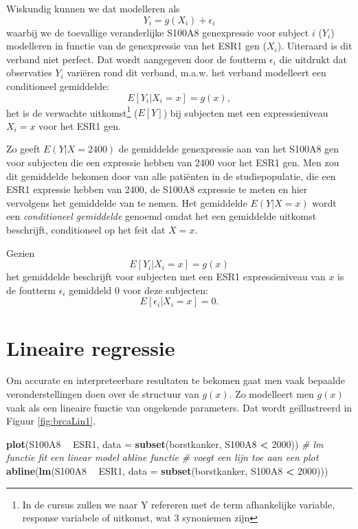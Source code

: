 \documentclass[12pt,dutch,coursenotes]{book}
\newenvironment{Shaded}{\begin{snugshade}}{\end{snugshade}}
\newcommand{\KeywordTok}[1]{\textcolor[rgb]{0.13,0.29,0.53}{\textbf{#1}}}
\newcommand{\DataTypeTok}[1]{\textcolor[rgb]{0.13,0.29,0.53}{#1}}
\newcommand{\DecValTok}[1]{\textcolor[rgb]{0.00,0.00,0.81}{#1}}
\newcommand{\StringTok}[1]{\textcolor[rgb]{0.31,0.60,0.02}{#1}}
\newcommand{\CommentTok}[1]{\textcolor[rgb]{0.56,0.35,0.01}{\textit{#1}}}
\newcommand{\OperatorTok}[1]{\textcolor[rgb]{0.81,0.36,0.00}{\textbf{#1}}}
\newcommand{\NormalTok}[1]{#1}
\let\rmarkdownfootnote\footnote%
\def\footnote{\protect\rmarkdownfootnote}
\theoremstyle{definition}
\theoremstyle{definition}
\theoremstyle{definition}
\theoremstyle{remark}
\begin{document}
Wiskundig kunnen we dat modelleren als \[Y_i=g(X_i)+\epsilon_i\] waarbij
we de toevallige veranderlijke S100A8 genexpressie voor subject \(i\)
(\(Y_i\)) modelleren in functie van de genexpressie van het ESR1 gen
(\(X_i\)). Uiteraard is dit verband niet perfect. Dat wordt aangegeven
door de foutterm \(\epsilon_i\) die uitdrukt dat observaties \(Y_i\)
variëren rond dit verband, m.a.w. het verband modelleert een
conditioneel gemiddelde: \[E[Y_i|X_i=x]=g(x),\] het is de verwachte
uitkomst\footnote{In de cursus zullen we naar Y refereren met de term
  afhankelijke variable, response variabele of uitkomst, wat 3
  synoniemen zijn} (\(E[Y]\)) bij subjecten met een expressieniveau
\(X_i=x\) voor het ESR1 gen.

Zo geeft \(E(Y|X=2400)\) de gemiddelde genexpressie aan van het S100A8
gen voor subjecten die een expressie hebben van 2400 voor het ESR1 gen.
Men zou dit gemiddelde bekomen door van alle patiënten in de
studiepopulatie, die een ESR1 expressie hebben van 2400, de S100A8
expressie te meten en hier vervolgens het gemiddelde van te nemen. Het
gemiddelde \(E(Y|X=x)\) wordt een \emph{conditioneel gemiddelde} genoemd
omdat het een gemiddelde uitkomst beschrijft, conditioneel op het feit
dat \(X=x\).

Gezien \[E[Y_i|X_i=x]=g(x)\] het gemiddelde beschrijft voor subjecten
met een ESR1 expressieniveau van \(x\) is de foutterm \(\epsilon_i\)
gemiddeld 0 voor deze subjecten: \[E[\epsilon_i\vert X_i=x]=0.\]

\section{Lineaire regressie}\label{lineaire-regressie}

Om accurate en interpreteerbare resultaten te bekomen gaat men vaak
bepaalde veronderstellingen doen over de structuur van \(g(x)\). Zo
modelleert men \(g(x)\) vaak als een lineaire functie van ongekende
parameters. Dat wordt geïllustreerd in Figuur \ref{fig:brcaLin1}.

\begin{Shaded}
\begin{Highlighting}[]
\KeywordTok{plot}\NormalTok{(S100A8 }\OperatorTok{~}\StringTok{ }\NormalTok{ESR1, }\DataTypeTok{data =} \KeywordTok{subset}\NormalTok{(borstkanker, S100A8 }\OperatorTok{<}\StringTok{ }
\StringTok{    }\DecValTok{2000}\NormalTok{))}
\CommentTok{# lm functie fit een linear model abline functie}
\CommentTok{# voegt een lijn toe aan een plot}
\KeywordTok{abline}\NormalTok{(}\KeywordTok{lm}\NormalTok{(S100A8 }\OperatorTok{~}\StringTok{ }\NormalTok{ESR1, }\DataTypeTok{data =} \KeywordTok{subset}\NormalTok{(borstkanker, }
\NormalTok{    S100A8 }\OperatorTok{<}\StringTok{ }\DecValTok{2000}\NormalTok{)))}
\end{Highlighting}
\end{Shaded}
\end{document}
